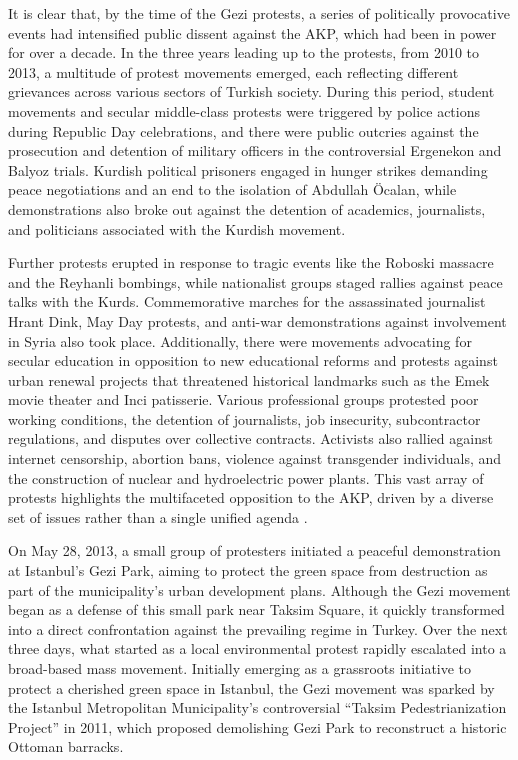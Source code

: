 It is clear that, by the time of the Gezi protests, a series of politically provocative events had intensified public dissent against the AKP, which had been in power for over a decade. In the three years leading up to the protests, from 2010 to 2013, a multitude of protest movements emerged, each reflecting different grievances across various sectors of Turkish society. During this period, student movements and secular middle-class protests were triggered by police actions during Republic Day celebrations, and there were public outcries against the prosecution and detention of military officers in the controversial Ergenekon and Balyoz trials. Kurdish political prisoners engaged in hunger strikes demanding peace negotiations and an end to the isolation of Abdullah Öcalan, while demonstrations also broke out against the detention of academics, journalists, and politicians associated with the Kurdish movement.

Further protests erupted in response to tragic events like the Roboski massacre and the Reyhanli bombings, while nationalist groups staged rallies against peace talks with the Kurds. Commemorative marches for the assassinated journalist Hrant Dink, May Day protests, and anti-war demonstrations against involvement in Syria also took place. Additionally, there were movements advocating for secular education in opposition to new educational reforms and protests against urban renewal projects that threatened historical landmarks such as the Emek movie theater and Inci patisserie. Various professional groups protested poor working conditions, the detention of journalists, job insecurity, subcontractor regulations, and disputes over collective contracts. Activists also rallied against internet censorship, abortion bans, violence against transgender individuals, and the construction of nuclear and hydroelectric power plants. This vast array of protests highlights the multifaceted opposition to the AKP, driven by a diverse set of issues rather than a single unified agenda \parencite[see 211]{defneover2017}.

On May 28, 2013, a small group of protesters initiated a peaceful demonstration at Istanbul's Gezi Park, aiming to protect the green space from destruction as part of the municipality's urban development plans. Although the Gezi movement began as a defense of this small park near Taksim Square, it quickly transformed into a direct confrontation against the prevailing regime in Turkey. Over the next three days, what started as a local environmental protest rapidly escalated into a broad-based mass movement. Initially emerging as a grassroots initiative to protect a cherished green space in Istanbul, the Gezi movement was sparked by the Istanbul Metropolitan Municipality’s controversial “Taksim Pedestrianization Project” in 2011, which proposed demolishing Gezi Park to reconstruct a historic Ottoman barracks.

